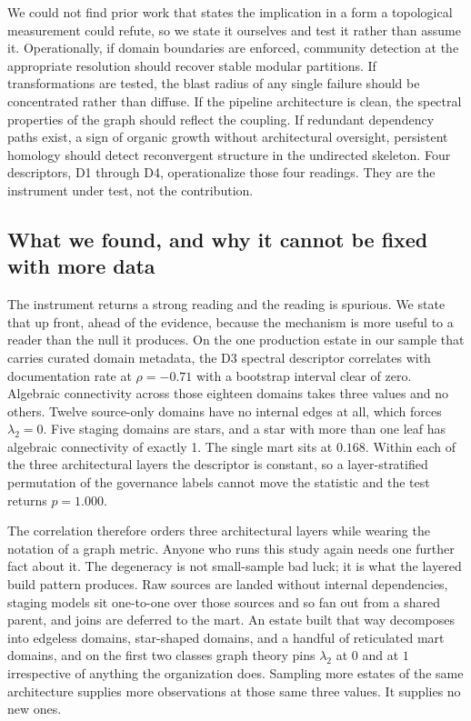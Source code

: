 \documentclass[11pt,a4paper]{article}
\begin{document}
We could not find prior work that states the implication in a form a
topological measurement could refute, so we state it ourselves and test
it rather than assume it. Operationally, if domain boundaries are
enforced, community detection at the appropriate resolution should
recover stable modular partitions. If transformations are tested, the
blast radius of any single failure should be concentrated rather than
diffuse. If the pipeline architecture is clean, the spectral properties
of the graph should reflect the coupling. If redundant dependency paths
exist, a sign of organic growth without architectural oversight,
persistent homology should detect reconvergent structure in the
undirected skeleton. Four descriptors, D1 through D4, operationalize
those four readings. They are the instrument under test, not the
contribution.

\subsection{What we found, and why it cannot be fixed with more data}

The instrument returns a strong reading and the reading is spurious. We
state that up front, ahead of the evidence, because the mechanism is
more useful to a reader than the null it produces. On the one production
estate in our sample that carries curated domain metadata, the D3
spectral descriptor correlates with documentation rate at $\rho = -0.71$
with a bootstrap interval clear of zero. Algebraic connectivity across
those eighteen domains takes three values and no others. Twelve
source-only domains have no internal edges at all, which forces
$\lambda_2 = 0$. Five staging domains are stars, and a star with more
than one leaf has algebraic connectivity of exactly 1. The single mart
sits at $0.168$. Within each of the three architectural
layers the descriptor is constant, so a layer-stratified permutation of
the governance labels cannot move the statistic and the test returns
$p = 1.000$.

The correlation therefore orders three architectural layers while
wearing the notation of a graph metric. Anyone who runs this study again
needs one further fact about it. The degeneracy is not small-sample bad
luck; it is what the layered build pattern produces. Raw sources are
landed without internal dependencies, staging models sit one-to-one over
those sources and so fan out from a shared parent, and joins are
deferred to the mart. An estate built that way decomposes into edgeless
domains, star-shaped domains, and a handful of reticulated mart domains,
and on the first two classes graph theory pins $\lambda_2$ at $0$ and at
$1$ irrespective of anything the organization does. Sampling more
estates of the same architecture supplies more observations at those
same three values. It supplies no new ones.
\end{document}
